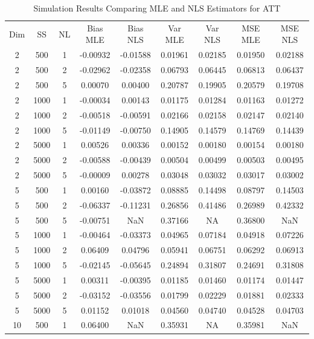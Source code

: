 \documentclass{article}
\begin{document}
\begin{table}
  \centering
  \caption{Simulation Results Comparing MLE and NLS Estimators for ATT}
  \label{tab:simulation_results}
  \begin{tabular}{ccccccccc}
      Dim & SS & NL & Bias MLE & Bias NLS & Var MLE & Var NLS & MSE MLE & MSE NLS \\
      2 & 500 & 1 & -0.00932 & -0.01588 & 0.01961 & 0.02185 & 0.01950 & 0.02188 \\
      2 & 500 & 2 & -0.02962 & -0.02358 & 0.06793 & 0.06445 & 0.06813 & 0.06437 \\
      2 & 500 & 5 & 0.00070 & 0.00400 & 0.20787 & 0.19905 & 0.20579 & 0.19708 \\
      2 & 1000 & 1 & -0.00034 & 0.00143 & 0.01175 & 0.01284 & 0.01163 & 0.01272 \\
      2 & 1000 & 2 & -0.00518 & -0.00591 & 0.02166 & 0.02158 & 0.02147 & 0.02140 \\
      2 & 1000 & 5 & -0.01149 & -0.00750 & 0.14905 & 0.14579 & 0.14769 & 0.14439 \\
      2 & 5000 & 1 & 0.00526 & 0.00336 & 0.00152 & 0.00180 & 0.00154 & 0.00180 \\
      2 & 5000 & 2 & -0.00588 & -0.00439 & 0.00504 & 0.00499 & 0.00503 & 0.00495 \\
      2 & 5000 & 5 & -0.00009 & 0.00278 & 0.03048 & 0.03032 & 0.03017 & 0.03002 \\
      5 & 500 & 1 & 0.00160 & -0.03872 & 0.08885 & 0.14498 & 0.08797 & 0.14503 \\
      5 & 500 & 2 & -0.06337 & -0.11231 & 0.26856 & 0.41486 & 0.26989 & 0.42332 \\
      5 & 500 & 5 & -0.00751 & NaN & 0.37166 & NA & 0.36800 & NaN \\
      5 & 1000 & 1 & -0.00464 & -0.03373 & 0.04965 & 0.07184 & 0.04918 & 0.07226 \\
      5 & 1000 & 2 & 0.06409 & 0.04796 & 0.05941 & 0.06751 & 0.06292 & 0.06913 \\
      5 & 1000 & 5 & -0.02145 & -0.05645 & 0.24894 & 0.31807 & 0.24691 & 0.31808 \\
      5 & 5000 & 1 & 0.00311 & -0.00395 & 0.01185 & 0.01460 & 0.01174 & 0.01447 \\
      5 & 5000 & 2 & -0.03152 & -0.03556 & 0.01799 & 0.02229 & 0.01881 & 0.02333 \\
      5 & 5000 & 5 & 0.01152 & 0.01018 & 0.04560 & 0.04740 & 0.04528 & 0.04703 \\
      10 & 500 & 1 & 0.06400 & NaN & 0.35931 & NA & 0.35981 & NaN \\

\end{tabular}
\end{table}
\end{document}
